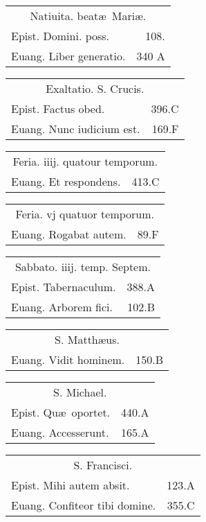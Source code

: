 \documentclass[a5paper,10pt]{book}
\def\ae{æ}
\begin{document}
\begin{multicols}{2}
\begin{tabular}{l r}
\multicolumn{2}{c}{\color{red} Natiuita. beat\ae \ Mari\ae .}\\
Epist. Domini. poss. & 108.\\
Euang. Liber generatio. & 340 A\\%
\end{tabular}
\begin{tabular}{l r}
\multicolumn{2}{c}{\color{red} Exaltatio. S. Crucis.}\\
Epist. Factus obed. & 396.C\\
Euang. Nunc iudicium est. & 169.F\\
\end{tabular}
\begin{tabular}{l r}
\multicolumn{2}{c}{\color{red} Feria. iiij. quatour temporum.}\\
Euang. Et respondens. & 413.C\\
\end{tabular}
\begin{tabular}{l r}
\multicolumn{2}{c}{\color{red} Feria. vj quatuor temporum.}\\
Euang. Rogabat autem. & 89.F\\
\end{tabular}
\begin{tabular}{l r}
\multicolumn{2}{c}{\color{red} Sabbato. iiij. temp. Septem.}\\
Epist. Tabernaculum. & 388.A\\
Euang. Arborem fici. & 102.B\\
\end{tabular}
\begin{tabular}{l r}
\multicolumn{2}{c}{\color{red} S. Matth\ae us.}\\
Euang. Vidit hominem. & 150.B\\
\end{tabular}
\begin{tabular}{l r}
\multicolumn{2}{c}{\color{red} S. Michael.}\\
Epist. Qu\ae \ oportet. & 440.A\\
Euang. Accesserunt. & 165.A\\
\end{tabular}
\begin{tabular}{l r}
\multicolumn{2}{c}{\color{red} S. Francisci.}\\
Epist. Mihi autem absit. & 123.A\\
Euang. Confiteor tibi domine. & 355.C\\
\end{tabular}

\end{multicols}
\end{document}
